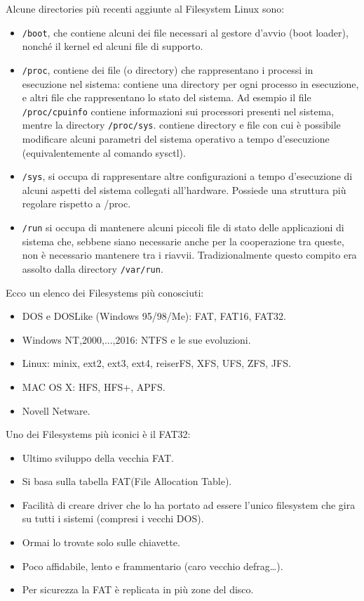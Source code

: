 \documentclass[a4paper]{report}
\begin{document}
Alcune directories più recenti aggiunte al Filesystem Linux sono:
\begin{itemize}
\item \texttt{/boot}, che contiene alcuni dei file necessari al gestore d'avvio (boot loader), nonché
il kernel ed alcuni file di supporto.
\item \texttt{/proc}, contiene dei file (o directory) che rappresentano i processi in esecuzione nel
sistema: contiene una directory per ogni processo in esecuzione, e altri file che
rappresentano lo stato del sistema. Ad esempio il file \texttt{/proc/cpuinfo} contiene
informazioni sui processori presenti nel sistema, mentre la directory \texttt{/proc/sys}.
contiene directory e file con cui è possibile modificare alcuni parametri del sistema
operativo a tempo d'esecuzione (equivalentemente al comando sysctl).
\item \texttt{/sys}, si occupa di rappresentare altre configurazioni a tempo d'esecuzione di alcuni
aspetti del sistema collegati all'hardware. Possiede una struttura più regolare
rispetto a /proc.
\item \texttt{/run} si occupa di mantenere alcuni piccoli file di stato delle applicazioni di sistema
che, sebbene siano necessarie anche per la cooperazione tra queste, non è
necessario mantenere tra i riavvii. Tradizionalmente questo compito era assolto
dalla directory \texttt{/var/run}.
\end{itemize}
Ecco un elenco dei Filesystems più conosciuti:
\begin{itemize}
\item DOS e DOSLike (Windows 95/98/Me): FAT,
FAT16, FAT32.
\item Windows NT,2000,...,2016: NTFS e le sue
evoluzioni.
\item Linux: minix, ext2, ext3, ext4, reiserFS, XFS,
UFS, ZFS, JFS.
\item MAC OS X: HFS, HFS+, APFS.
\item Novell Netware.
\end{itemize}
Uno dei Filesystems più iconici è il FAT32:
\begin{itemize}
\item Ultimo sviluppo della vecchia FAT.
\item Si basa sulla tabella FAT(File Allocation Table).
\item Facilità di creare driver che lo ha portato ad essere
l'unico filesystem che gira su tutti i sistemi (compresi i
vecchi DOS).
\item Ormai lo trovate solo sulle chiavette.
\item Poco affidabile, lento e frammentario (caro vecchio
defrag…).
\item Per sicurezza la FAT è replicata in più zone del disco.
\end{itemize}
\end{document}
